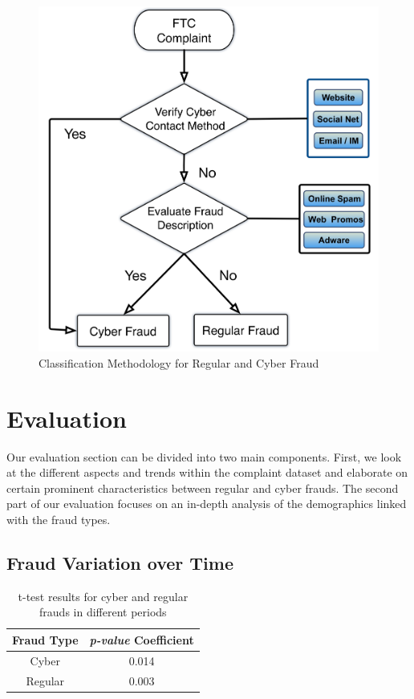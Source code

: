 \documentclass[conference]{IEEEtran}
\begin{document}
\begin{figure}[t]
\centering
  \includegraphics[scale=0.30]{graphics/methodology.png}
  \caption{Classification Methodology for Regular and Cyber Fraud}
  \label{classify}
\end{figure}

\section{Evaluation}\label{eval}

Our evaluation section can be divided into two main components. First, we look at the different aspects and trends within the complaint dataset and elaborate on certain prominent characteristics between regular and cyber frauds. The second part of our evaluation focuses on an in-depth analysis of the demographics linked with the fraud types.



\subsection{Fraud Variation over Time}

\begin{table}[b]
\centering
\begin{tabular}{cc}
\hline
\multicolumn{1}{c}{\bfseries Fraud Type} & \multicolumn{1}{c}{\bfseries \emph{p-value}
Coefficient}
\\
\hline
\hline
Cyber & 0.014\\
\hline
Regular & 0.003\\
\hline
\end{tabular}
\vspace{8pt}
\caption{t-test results for cyber and regular frauds in different periods}\label{ttest}
\vspace{-10pt}
\end{table}
\end{document}
